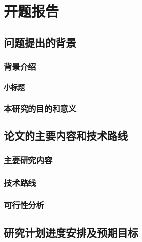 \cleardoublepage
\section{开题报告}

\bullshit

\subsection{问题提出的背景}

\bullshit

\subsubsection{背景介绍}

\bullshit

\paragraph{小标题}

\bullshit

\subsubsection{本研究的目的和意义}

\bullshit

\newpage
\subsection{论文的主要内容和技术路线}

\bullshit

\subsubsection{主要研究内容}

\bullshit

\subsubsection{技术路线}

\bullshit

\subsubsection{可行性分析}

\bullshit

\newpage
\subsection{研究计划进度安排及预期目标}


